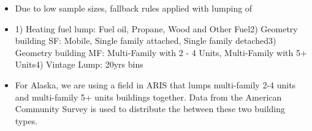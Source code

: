 \begin{itemize}
\item Due to low sample sizes, fallback rules applied with lumping of
\item 1) Heating fuel lump: Fuel oil, Propane, Wood and Other Fuel2) Geometry building SF: Mobile, Single family attached, Single family detached3) Geometry building MF: Multi-Family with 2 - 4 Units, Multi-Family with 5+ Units4) Vintage Lump: 20yrs bins
\item For Alaska, we are using a field in ARIS that lumps multi-family 2-4 units and multi-family 5+ units buildings together. Data from the American Community Survey is used to distribute the between these two building types.
\end{itemize}
